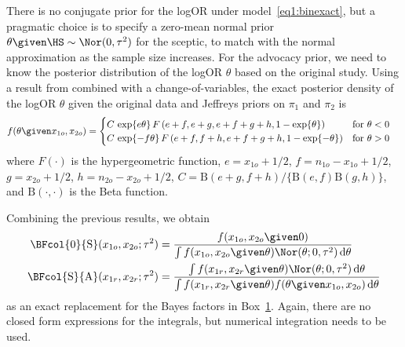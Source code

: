 There is no conjugate prior for the logOR under model~\eqref{eq1:binexact}, but a
pragmatic choice is to specify a zero-mean normal prior
$\theta \given \HS \sim \Nor(0, \tau^{2})$ for the sceptic, to match with the
normal approximation as the sample size increases. For the advocacy prior, we
need to know the posterior distribution of the logOR $\theta$ based on the
original study.
Using a result from \citet{Marshall1988} combined with a change-of-variables,
the exact posterior density of the logOR $\theta$ given the original data and
Jeffreys priors on $\pi_1$ and $\pi_2$ is
\begin{align*}
  f(\theta \given x_{1o}, x_{2o}) &=
  \begin{cases}
    C \, \exp\{e \theta\} \,
    F\left(e + f, e + g, e + f + g + h, 1 - \exp\{\theta\}\right)
    & \text{for} ~ \theta < 0 \\
    C \, \exp\{-f \theta\} \,
    F\left(e + f, f + h, e + f + g + h, 1 - \exp\{-\theta\}\right)
    & \text{for} ~ \theta > 0 \\
  \end{cases}
\end{align*}
where $F(\cdot)$ is the hypergeometric function, $e = x_{1o} + 1/2$,
$f = n_{1o} - x_{1o} + 1/2$, $g = x_{2o} + 1/2$, $h = n_{2o} - x_{2o} + 1/2$,
$C = \text{B}(e + g, f + h)/\{\text{B}(e, f) \text{B}(g, h)\}$, and
$\text{B}(\cdot, \cdot)$ is the Beta function.

Combining the previous results, we obtain
\begin{align*}
  \BFcol{0}{\text{S}}(x_{1o}, x_{2o};\tau^{2})
  &= \frac{ f(x_{1o}, x_{2o} \given 0)}{\int
   f(x_{1o}, x_{2o} \given \theta)
  \Nor(\theta; 0, \tau^{2}) \, \text{d}\theta} \\
  \BFcol{\text{S}}{\text{A}}(x_{1r}, x_{2r};\tau^{2})
  &= \frac{\int f(x_{1r}, x_{2r} \given \theta)
    \Nor(\theta; 0, \tau^{2}) \, \text{d}\theta}{
    \int f(x_{1r}, x_{2r} \given \theta)
    f(\theta \given x_{1o}, x_{2o}) \, \text{d} \theta}
\end{align*}
as an exact replacement for the Bayes factors in Box~\hyperref[box:nutshell]{1}.
Again, there are no closed form expressions for the integrals, but numerical
integration needs to be used.


